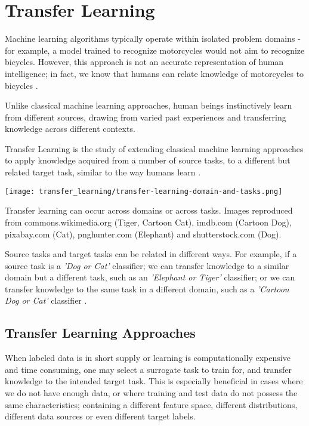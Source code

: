 \chapter[Transfer Learning]{Transfer Learning}
\label{ch:transfer-learning}

Machine learning algorithms typically operate within isolated problem domains - for example, a model trained to recognize motorcycles would not aim to recognize bicycles. However, this approach is not an accurate representation of human intelligence; in fact, we know that humans can relate knowledge of motorcycles to bicycles \citep{aytar2011}. 

Unlike classical machine learning approaches, human beings instinctively learn from different sources, drawing from varied past experiences and transferring knowledge across different contexts. 

Transfer Learning is the study of extending classical machine learning approaches to apply knowledge acquired from a number of source tasks, to a different but related target task, similar to the way humans learn \citep{thrunpratt1998}. 

\begin{marginfigure}
  \texttt{[image: transfer\_learning/transfer-learning-domain-and-tasks.png]}
  \caption{Transfer learning can occur across domains or across tasks. Images reproduced from commons.wikimedia.org (Tiger, Cartoon Cat), imdb.com (Cartoon Dog), pixabay.com (Cat), pnghunter.com (Elephant) and shutterstock.com (Dog).}
  \label{fig:transferlearning_domaintask}
\end{marginfigure}



Source tasks and target tasks can be related in different ways. For example, if a source task is a \textit{'Dog or Cat'} classifier; we can transfer knowledge to a similar domain but a different task, such as an \textit{'Elephant or Tiger'} classifier; or we can transfer knowledge to the same task in a different domain, such as a \textit{'Cartoon Dog or Cat'} classifier \citep{torrey2009}. 


\section{Transfer Learning Approaches}\label{sec:transfer-learning-approaches}

When labeled data is in short supply or learning is computationally expensive and time consuming, one may select a surrogate task to train for, and transfer knowledge to the intended target task.  This is especially beneficial in cases where we do not have enough data, or where training and test data do not possess the same characteristics; containing a different feature space, different distributions, different data sources or even different target labels. 


